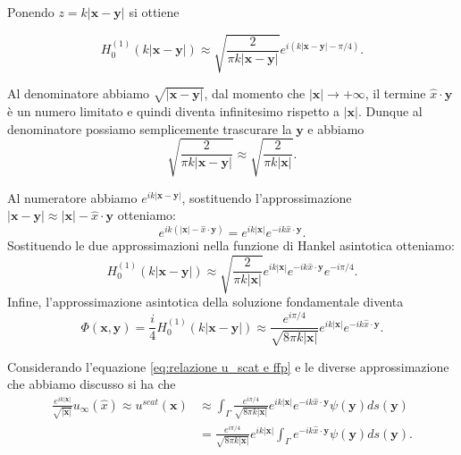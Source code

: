 \documentclass[a4paper,12pt]{article}
\theoremstyle{definition}
\begin{document}
Ponendo $z= k|\textbf{x}-\textbf{y}|$ si ottiene

\begin{equation*}
	H_0^{(1)}(k|\textbf{x}-\textbf{y}|) \approx \sqrt{\frac{2}{\pi k|\textbf{x}-\textbf{y}|}} e^{i(k|\textbf{x}-\textbf{y}|-\pi/4)}.
\end{equation*}

Al denominatore abbiamo $\sqrt{|\textbf{x}-\textbf{y}|}$, dal momento che $|\textbf{x}|\rightarrow + \infty $, il termine $\hat{x}\cdot \textbf{y}$ è un numero limitato e quindi diventa infinitesimo rispetto a $|\textbf{x}|$. Dunque al denominatore possiamo semplicemente trascurare la $\textbf{y}$ e abbiamo
\begin{equation*}
	\sqrt{\frac{2}{\pi k |\textbf{x}-\textbf{y}|}} \approx \sqrt{\frac{2}{\pi k |\textbf{x}|}}.
\end{equation*}

Al numeratore abbiamo $e^{ik |\textbf{x}-\textbf{y}|}$, sostituendo l'approssimazione $|\textbf{x}-\textbf{y}| \approx |\textbf{x}| - \hat{x}\cdot \textbf{y}$ otteniamo:
\begin{equation*}
	e^{ik(|\textbf{x}| - \hat{x}\cdot \textbf{y})} = e^{ik|\textbf{x}|} e^{-ik\hat{x}\cdot \textbf{y}}.
\end{equation*}
Sostituendo le due approssimazioni nella funzione di Hankel asintotica otteniamo:
\begin{equation*}
	H_0^{(1)}(k|\textbf{x}-\textbf{y}|) \approx \sqrt{\frac{2}{\pi k |\textbf{x}|}}e^{ik|\textbf{x}|}e^{-ik \hat{x}\cdot \textbf{y}}e^{-i\pi/4}. 
\end{equation*}
Infine, l'approssimazione asintotica della soluzione fondamentale diventa
\begin{equation}
	\Phi(\textbf{x}, \textbf{y})= \frac{i}{4}H_0^{(1)}(k|\textbf{x}-\textbf{y}|) \approx \frac{e^{i\pi /4}}{\sqrt{8\pi k |\textbf{x}|}}e^{ik|\textbf{x}|}e^{-ik \hat{x}\cdot \textbf{y}}.
\end{equation}


Considerando l'equazione \ref{eq:relazione u_scat e ffp} e le diverse approssimazione che abbiamo discusso si ha che 
\begin{equation*}
	\begin{aligned}
		\frac{e^{ik|\textbf{x}|}}{\sqrt{|\textbf{x}|}} u_\infty(\hat{x}) \approx u^{scat}(\textbf{x}) &\approx \int_\Gamma \frac{e^{i\pi/4}}{\sqrt{8\pi k |\textbf{x}|}} e^{ik|\textbf{x}|}e^{-ik\hat{x}\cdot \textbf{y}} \psi(\textbf{y})ds(\textbf{y})\\
		&= \frac{e^{i\pi/4}}{\sqrt{8\pi k |\textbf{x}|}} e^{ik|\textbf{x}|} \int_\Gamma e^{-ik\hat{x}\cdot \textbf{y}} \psi(\textbf{y})ds(\textbf{y}).
	\end{aligned}
\end{equation*}
\end{document}
